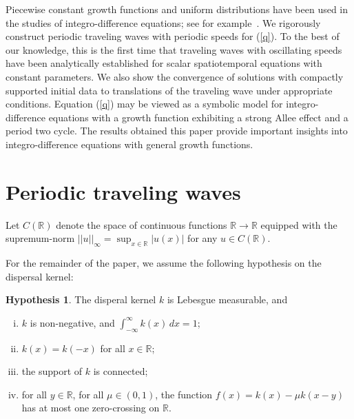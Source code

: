 \documentclass[11pt]{article}
\theoremstyle{definition}
\newtheorem{hyp}[thm]{Hypothesis}
\numberwithin{equation}{section}
\numberwithin{thm}{section}
\begin{document}
Piecewise constant growth functions and uniform distributions have been used in the studies of integro-difference equations; see for example~\cite{kot1, lut,otto,  pnas}. We rigorously construct periodic traveling waves with periodic speeds for (\ref{q}). To the best of our knowledge, this is the first time that traveling waves with oscillating speeds have been analytically established  for scalar spatiotemporal equations with constant parameters. We also show the convergence of solutions with compactly supported initial data to translations of the traveling wave under appropriate conditions. Equation (\ref{q}) may be viewed as a symbolic model for integro-difference equations with a growth function exhibiting a strong Allee effect and a period two cycle. The results obtained this paper provide important insights into integro-difference equations with general growth functions. 


\section{Periodic traveling waves}

Let $C(\mathbb R)$ denote the space of continuous functions $\mathbb R\to\mathbb R$ equipped with the supremum-norm $||u||_\infty=\sup_{x\in\mathbb R}|u(x)|$ for any $u\in C(\mathbb R)$.

For the remainder of the paper, we assume the following hypothesis on the dispersal kernel:

\def\Hone{(\text{H1})}
\def\Htwo{(\text{H2})}
\def\Hthree{(\text{H3})}
\def\Hfour{(\text{H4})}

\begin{hyp} \label{hypothesis1} The disperal kernel $k$ is Lebesgue measurable, and

\begin{enumerate}[i.)]
\item $k$ is non-negative, and $\int_{-\infty}^{\infty} k(x) \, dx = 1$;

\item $k(x)=k(-x)$ for all $x\in\mathbb R$;

\item the support of $k$ is connected;

\item  for all $y\in\mathbb R$, for all $\mu\in(0,1)$, the function $f(x)= k(x)-\mu k(x-y)$ has at most one zero-crossing on $\mathbb R$.
\end{enumerate}
\end{hyp}
\end{document}
